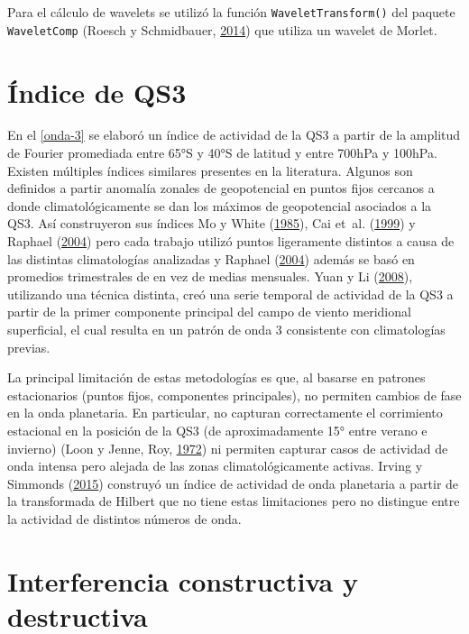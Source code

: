 \documentclass[spanish,a4paper,12pt,oneside]{book}
\begin{document}
Para el cálculo de wavelets se utilizó la función
\texttt{WaveletTransform()} del paquete \texttt{WaveletComp} (Roesch y
Schmidbauer, \protect\hyperlink{ref-R-WaveletComp}{2014}) que utiliza un
wavelet de Morlet.

\section*{Índice de QS3}

En el \autoref{onda-3} se elaboró un índice de actividad de la QS3 a
partir de la amplitud de Fourier promediada entre 65°S y 40°S de latitud
y entre 700hPa y 100hPa. Existen múltiples índices similares presentes
en la literatura. Algunos son definidos a partir anomalía zonales de
geopotencial en puntos fijos cercanos a donde climatológicamente se dan
los máximos de geopotencial asociados a la QS3. Así construyeron sus
índices Mo y White (\protect\hyperlink{ref-Mo1985}{1985}), Cai et~al.
(\protect\hyperlink{ref-Cai1999}{1999}) y Raphael
(\protect\hyperlink{ref-Raphael2004}{2004}) pero cada trabajo utilizó
puntos ligeramente distintos a causa de las distintas climatologías
analizadas y Raphael (\protect\hyperlink{ref-Raphael2004}{2004}) además
se basó en promedios trimestrales de en vez de medias mensuales. Yuan y
Li (\protect\hyperlink{ref-Yuan2008}{2008}), utilizando una técnica
distinta, creó una serie temporal de actividad de la QS3 a partir de la
primer componente principal del campo de viento meridional superficial,
el cual resulta en un patrón de onda 3 consistente con climatologías
previas.

La principal limitación de estas metodologías es que, al basarse en
patrones estacionarios (puntos fijos, componentes principales), no
permiten cambios de fase en la onda planetaria. En particular, no
capturan correctamente el corrimiento estacional en la posición de la
QS3 (de aproximadamente 15° entre verano e invierno) (Loon y Jenne, Roy,
\protect\hyperlink{ref-Loon1972}{1972}) ni permiten capturar casos de
actividad de onda intensa pero alejada de las zonas climatológicamente
activas. Irving y Simmonds (\protect\hyperlink{ref-Irving2015}{2015})
construyó un índice de actividad de onda planetaria a partir de la
transformada de Hilbert que no tiene estas limitaciones pero no
distingue entre la actividad de distintos números de onda.

\section*{Interferencia constructiva y destructiva}
\end{document}

